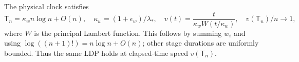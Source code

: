 The physical clock satisfies
\begin{equation}
 \mathsf T_n=\kappa_w n\log n+O(n),\quad
 \kappa_w=(1+\epsilon_w)/\lambda_*,\quad
 v(t)=\frac{t}{\kappa_w W(t/\kappa_w)},\quad
 v(\mathsf T_n)/n\to1,
 \label{eq:physical-time-complexity}
\end{equation}
where \(W\) is the principal Lambert function. This follows by summing
\(w_i\) and using \(\log((n+1)!)=n\log n+O(n)\); other stage durations
are uniformly bounded. Thus the same LDP holds at elapsed-time speed
\(v(\mathsf T_n)\).
